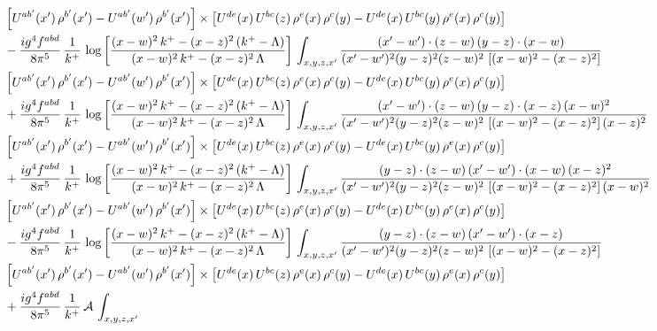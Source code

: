 \documentclass[9pt]{article}
\numberwithin{equation}{section}
\begin{document}
\begin{align}
&\left[U^{ab'}(x')\,\rho^{b'}(x')-U^{ab'}(w')\, \rho^{b'}(x')\right]\times \left[U^{de}(x)\,U^{bc}(z)\, \rho^{e}(x)\,\rho^{c}(y)-U^{de}(x)\,U^{bc}(y)\,\rho^{e}(x)\,\rho^{c}(y)\right]\notag \\ & -\frac{ig^{4}f^{abd}}{8\pi^{5}}\,\frac{1}{k^{+}}\,\log{\left[\frac{(x-w)^{2}\,k^{+}-(x-z)^{2}\,(k^{+}-\Lambda)}{(x-w)^{2}\,k^{+}-(x-z)^{2}\,\Lambda}\right]}\,\int_{x,y,z,x'}
\frac{(x'-w')\cdot(z-w)\,(y-z)\cdot(x-w)}{(x'-w')^{2}(y-z)^{2}(z-w)^{2}\,\left[(x-w)^{2}-(x-z)^{2}\right]}\notag \\ & \left[U^{ab'}(x')\,\rho^{b'}(x')-U^{ab'}(w')\, \rho^{b'}(x')\right]\times \left[U^{de}(x)\,U^{bc}(z)\, \rho^{e}(x)\,\rho^{c}(y)-U^{de}(x)\,U^{bc}(y)\,\rho^{e}(x)\,\rho^{c}(y)\right]\notag \\ &  +\frac{ig^{4}f^{abd}}{8\pi^{5}}\,\frac{1}{k^{+}}\,\log{\left[\frac{(x-w)^{2}\,k^{+}-(x-z)^{2}\,(k^{+}-\Lambda)}{(x-w)^{2}\,k^{+}-(x-z)^{2}\,\Lambda}\right]}\,\int_{x,y,z,x'}
\frac{(x'-w')\cdot(z-w)\,(y-z)\cdot(x-z)\,(x-w)^{2}}{(x'-w')^{2}(y-z)^{2}(z-w)^{2}\,\left[(x-w)^{2}-(x-z)^{2}\right](x-z)^{2}}\notag \\ & \left[U^{ab'}(x')\,\rho^{b'}(x')-U^{ab'}(w')\, \rho^{b'}(x')\right]\times \left[U^{de}(x)\,U^{bc}(z)\, \rho^{e}(x)\,\rho^{c}(y)-U^{de}(x)\,U^{bc}(y)\,\rho^{e}(x)\,\rho^{c}(y)\right]\notag \\ & +\frac{ig^{4}f^{abd}}{8\pi^{5}}\,\frac{1}{k^{+}}\,\log{\left[\frac{(x-w)^{2}\,k^{+}-(x-z)^{2}\,(k^{+}-\Lambda)}{(x-w)^{2}\,k^{+}-(x-z)^{2}\,\Lambda}\right]}\,\int_{x,y,z,x'}
\frac{(y-z)\cdot(z-w)\,(x'-w')\cdot(x-w)\,(x-z)^{2}}{(x'-w')^{2}(y-z)^{2}(z-w)^{2}\,\left[(x-w)^{2}-(x-z)^{2}\right](x-w)^{2}}\notag \\ 
& \left[U^{ab'}(x')\,\rho^{b'}(x')-U^{ab'}(w')\, \rho^{b'}(x')\right]\times \left[U^{de}(x)\,U^{bc}(z)\, \rho^{e}(x)\,\rho^{c}(y)-U^{de}(x)\,U^{bc}(y)\,\rho^{e}(x)\,\rho^{c}(y)\right]\notag \\ & -\frac{ig^{4}f^{abd}}{8\pi^{5}}\,\frac{1}{k^{+}}\,\log{\left[\frac{(x-w)^{2}\,k^{+}-(x-z)^{2}\,(k^{+}-\Lambda)}{(x-w)^{2}\,k^{+}-(x-z)^{2}\,\Lambda}\right]}\,\int_{x,y,z,x'}
\frac{(y-z)\cdot(z-w)\,(x'-w')\cdot(x-z)}{(x'-w')^{2}(y-z)^{2}(z-w)^{2}\,\left[(x-w)^{2}-(x-z)^{2}\right]}\notag \\ & \left[U^{ab'}(x')\,\rho^{b'}(x')-U^{ab'}(w')\, \rho^{b'}(x')\right]\times \left[U^{de}(x)\,U^{bc}(z)\, \rho^{e}(x)\,\rho^{c}(y)-U^{de}(x)\,U^{bc}(y)\,\rho^{e}(x)\,\rho^{c}(y)\right]\notag \\ & +\frac{ig^{4}f^{abd}}{8\pi^{5}}\,\frac{1}{k^{+}}\,\mathcal{A}\,\int_{x,y,z,x'}

\end{align}
\end{document}
